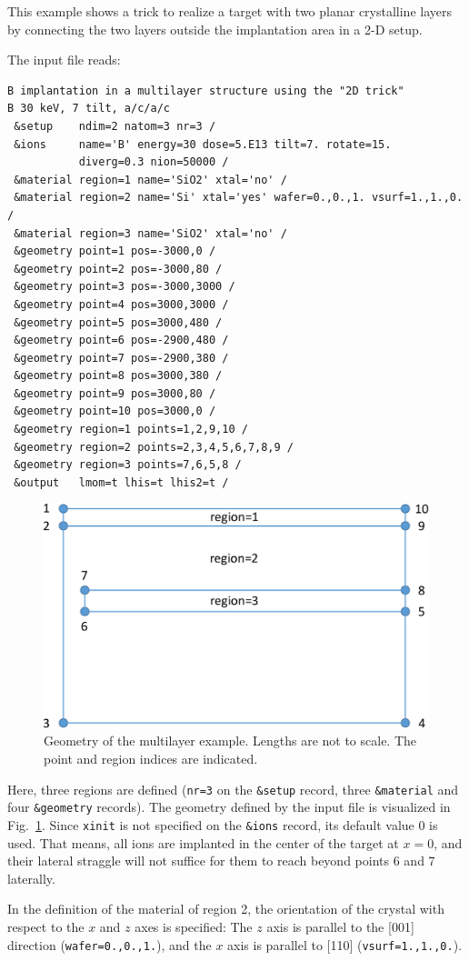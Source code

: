 This example shows a trick to realize a target with two planar crystalline
layers by connecting the two layers outside the implantation area in a 2-D
setup.

The input file reads:

\begin{verbatim}
B implantation in a multilayer structure using the "2D trick"
B 30 keV, 7 tilt, a/c/a/c
 &setup    ndim=2 natom=3 nr=3 /
 &ions     name='B' energy=30 dose=5.E13 tilt=7. rotate=15.
           diverg=0.3 nion=50000 /
 &material region=1 name='SiO2' xtal='no' /
 &material region=2 name='Si' xtal='yes' wafer=0.,0.,1. vsurf=1.,1.,0. /
 &material region=3 name='SiO2' xtal='no' /
 &geometry point=1 pos=-3000,0 /
 &geometry point=2 pos=-3000,80 /
 &geometry point=3 pos=-3000,3000 /
 &geometry point=4 pos=3000,3000 /
 &geometry point=5 pos=3000,480 /
 &geometry point=6 pos=-2900,480 /
 &geometry point=7 pos=-2900,380 /
 &geometry point=8 pos=3000,380 /
 &geometry point=9 pos=3000,80 /
 &geometry point=10 pos=3000,0 /
 &geometry region=1 points=1,2,9,10 /
 &geometry region=2 points=2,3,4,5,6,7,8,9 /
 &geometry region=3 points=7,6,5,8 /
 &output   lmom=t lhis=t lhis2=t /
\end{verbatim}

\begin{figure}[htbp]
\centering
\noindent\includegraphics[scale=0.6]{ex_multilayer-crop.pdf}
\caption{Geometry of the multilayer example. Lengths are not to scale. The
point and region indices are indicated.}
\label{fig:multilayer}
\end{figure}

Here, three regions are defined (\texttt{nr=3} on the \texttt{\&setup} record,
three \texttt{\&material} and four \texttt{\&geometry} records). The geometry
defined by the input file is visualized in Fig.~\ref{fig:multilayer}. Since
\texttt{xinit} is not specified on the \texttt{\&ions} record, its default
value 0 is used. That means, all ions are implanted in the center of the target
at $x=0$, and their lateral straggle will not suffice for them to reach beyond
points 6 and 7 laterally.

In the definition of the material of region 2, the orientation of the crystal
with respect to the $x$ and $z$ axes is specified: The $z$ axis is parallel to
the [001] direction (\texttt{wafer=0.,0.,1.}), and the $x$ axis is parallel to
[110] (\texttt{vsurf=1.,1.,0.}).

